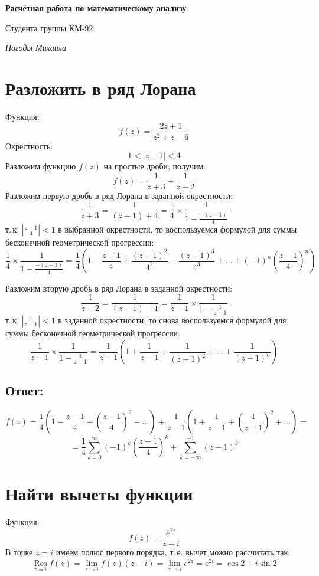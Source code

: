 \documentclass[12pt]{scrartcl}
\begin{document}
\begin{center}
\textbf{\huge Расчётная работа по математическому анализу}

Студента группы КМ-92

\textit{Погоды Михаила}
\end{center}
\section{Разложить в ряд Лорана}
Функция:
$$f\left(z\right) = \frac{2 z + 1}{z^2 + z -6}$$
Окрестность:
$$1 < \left| z - 1\right| < 4$$
Разложим функцию $f\left(z\right)$ на простые дроби, получим:
$$f\left(z\right) = \frac{1}{z+3} + \frac{1}{z-2}$$
Разложим первую дробь в ряд Лорана в заданной окрестности:
$$\frac{1}{z+3} = \frac{1}{\left(z-1\right)+4} = \frac14\times\frac{1}{1-\frac{-\left(z - 1\right)}{4}}$$
т.\,к. $\left|\frac{z-1}{4}\right| < 1$ в выбранной окрестности, то воспользуемся формулой для суммы бесконечной геометрической прогрессии:
$$\frac14\times\frac{1}{1-\frac{-\left(z-1\right)}{4}} = \frac14\left(1 - \frac{z-1}{4} + \frac{\left(z-1\right)^2}{4^2} - \frac{\left(z-1\right)^3}{4^3} + \dots + \left(-1\right)^n \left(\frac{z-1}{4}\right)^n\right)$$

Разложим вторую дробь в ряд Лорана в заданной окрестности:
$$\frac{1}{z-2} = \frac{1}{\left(z-1\right)-1} = \frac{1}{z-1}\times \frac{1}{1-\frac{1}{z-1}}$$
т.\,к. $\left|\frac{1}{z-1}\right| < 1$ в заданной окрестности, то снова воспользуемся формулой для суммы бесконечной геометрической прогрессии:
$$\frac{1}{z-1}\times\frac{1}{1-\frac{1}{z-1}} = \frac{1}{z-1}\left(1 + \frac{1}{z-1} + \frac{1}{\left(z-1\right)^2} + \dots + \frac{1}{\left(z-1\right)^n}\right)$$

\subsection*{Ответ:}
$$f\left(z\right) = \frac14\left(1 - \frac{z-1}{4} + \left(\frac{z-1}{4}\right)^2 - \dots\right) + \frac{1}{z-1}\left(1 + \frac{1}{z-1} + \left(\frac{1}{z-1}\right)^2+\dots\right) = $$
$$= \frac14\sum\limits_{k = 0}^{\infty} {\left(-1\right)^k\left(\frac{z-1}{4}\right)^k} + \sum\limits_{k=-\infty}^{-1}{\left(z-1\right)^k}$$
\newpage
\section{Найти вычеты функции}
Функция:
$$f\left(z\right) = \frac{e^{2z}}{z-i}$$
В точке $z = i$ имеем полюс первого порядка, т.\,е. вычет можно рассчитать так:
$$\mathop{\text{Res}}\limits_{z=i} f\left(z\right) = \lim\limits_{z\to i} f\left(z\right)\left(z-i\right) = \lim\limits_{z\to i}e^{2z} = e^{2i} = \cos2 + i\sin2$$
\end{document}
